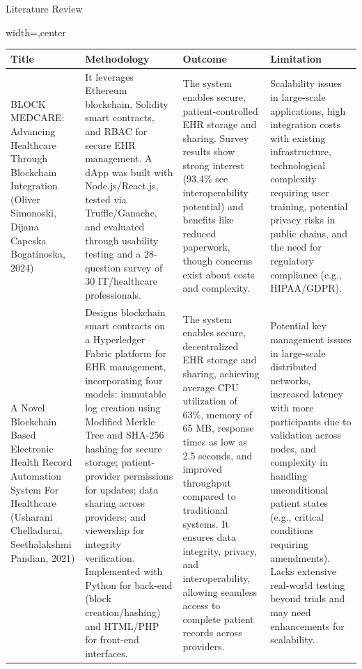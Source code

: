 \documentclass[10pt]{beamer}
\begin{document}
\begin{frame}{Literature Review}
\tiny
\begin{adjustbox}{width=\textwidth,center}
\begin{tabular}{p{3cm}p{3cm}p{3cm}p{3cm}}
\toprule
\textbf{Title} & \textbf{Methodology} & \textbf{Outcome} & \textbf{Limitation} \\
\midrule
BLOCK MEDCARE: Advancing Healthcare Through Blockchain Integration (Oliver Simonoski, Dijana Capeska Bogatinoska, 2024) & 
It leverages Ethereum blockchain, Solidity smart contracts, and RBAC for secure EHR management. A dApp was built with Node.js/React.js, tested via Truffle/Ganache, and evaluated through usability testing and a 28-question survey of 30 IT/healthcare professionals. & 
The system enables secure, patient-controlled EHR storage and sharing. Survey results show strong interest (93.4\% see interoperability potential) and benefits like reduced paperwork, though concerns exist about costs and complexity. & 
Scalability issues in large-scale applications, high integration costs with existing infrastructure, technological complexity requiring user training, potential privacy risks in public chains, and the need for regulatory compliance (e.g., HIPAA/GDPR). \\
\midrule
A Novel Blockchain Based Electronic Health Record Automation System For Healthcare (Usharani Chelladurai, Seethalakshmi Pandian, 2021) & 
Designs blockchain smart contracts on a Hyperledger Fabric platform for EHR management, incorporating four models: immutable log creation using Modified Merkle Tree and SHA-256 hashing for secure storage; patient-provider permissions for updates; data sharing across providers; and viewership for integrity verification. Implemented with Python for back-end (block creation/hashing) and HTML/PHP for front-end interfaces. & 
The system enables secure, decentralized EHR storage and sharing, achieving average CPU utilization of 63\%, memory of 65 MB, response times as low as 2.5 seconds, and improved throughput compared to traditional systems. It ensures data integrity, privacy, and interoperability, allowing seamless access to complete patient records across providers. & 
Potential key management issues in large-scale distributed networks, increased latency with more participants due to validation across nodes, and complexity in handling unconditional patient states (e.g., critical conditions requiring amendments). Lacks extensive real-world testing beyond trials and may need enhancements for scalability. \\

\end{tabular}
\end{adjustbox}
\end{frame}
\end{document}
